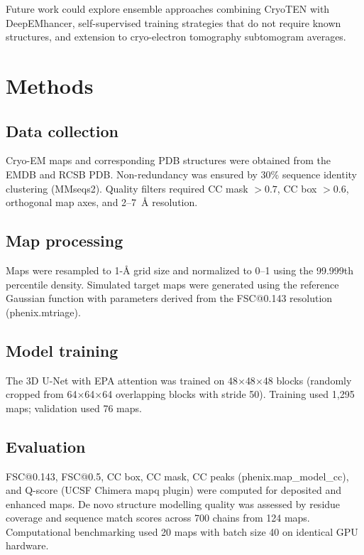 \documentclass[11pt]{article}
\begin{document}
Future work could explore ensemble approaches combining CryoTEN with DeepEMhancer, self-supervised training strategies that do not require known structures, and extension to cryo-electron tomography subtomogram averages.

\section{Methods}

\subsection{Data collection}
Cryo-EM maps and corresponding PDB structures were obtained from the EMDB and RCSB PDB. Non-redundancy was ensured by 30\% sequence identity clustering (MMseqs2). Quality filters required CC mask $> 0.7$, CC box $> 0.6$, orthogonal map axes, and 2--7~\AA{} resolution.

\subsection{Map processing}
Maps were resampled to 1-\AA{} grid size and normalized to 0--1 using the 99.999th percentile density. Simulated target maps were generated using the reference Gaussian function with parameters derived from the FSC@0.143 resolution (phenix.mtriage).

\subsection{Model training}
The 3D U-Net with EPA attention was trained on 48$\times$48$\times$48 blocks (randomly cropped from 64$\times$64$\times$64 overlapping blocks with stride 50). Training used 1,295 maps; validation used 76 maps.

\subsection{Evaluation}
FSC@0.143, FSC@0.5, CC box, CC mask, CC peaks (phenix.map\_model\_cc), and Q-score (UCSF Chimera mapq plugin) were computed for deposited and enhanced maps. De novo structure modelling quality was assessed by residue coverage and sequence match scores across 700 chains from 124 maps. Computational benchmarking used 20 maps with batch size 40 on identical GPU hardware.


\end{document}
